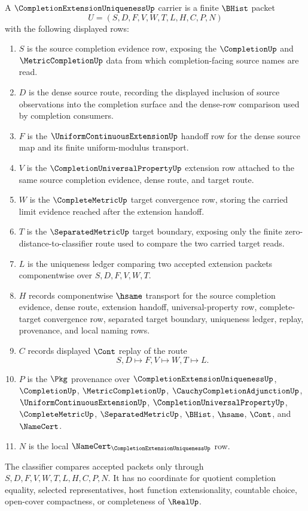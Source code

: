 \begin{definition}
\label{def:completion-extension-uniqueness-carrier}
A $\CompletionExtensionUniquenessUp$ carrier is a finite $\BHist$ packet
$$
U=(S,D,F,V,W,T,L,H,C,P,N)
$$
with the following displayed rows:
\begin{enumerate}
\item $S$ is the source completion evidence row, exposing the $\CompletionUp$ and $\MetricCompletionUp$ data from which completion-facing source names are read.
\item $D$ is the dense source route, recording the displayed inclusion of source observations into the completion surface and the dense-row comparison used by completion consumers.
\item $F$ is the $\UniformContinuousExtensionUp$ handoff row for the dense source map and its finite uniform-modulus transport.
\item $V$ is the $\CompletionUniversalPropertyUp$ extension row attached to the same source completion evidence, dense route, and target route.
\item $W$ is the $\CompleteMetricUp$ target convergence row, storing the carried limit evidence reached after the extension handoff.
\item $T$ is the $\SeparatedMetricUp$ target boundary, exposing only the finite zero-distance-to-classifier route used to compare the two carried target reads.
\item $L$ is the uniqueness ledger comparing two accepted extension packets componentwise over $S,D,F,V,W,T$.
\item $H$ records componentwise $\hsame$ transport for the source completion evidence, dense route, extension handoff, universal-property row, complete-target convergence row, separated target boundary, uniqueness ledger, replay, provenance, and local naming rows.
\item $C$ records displayed $\Cont$ replay of the route
$$
S,D\longmapsto F,V\longmapsto W,T\longmapsto L .
$$
\item $P$ is the $\Pkg$ provenance over $\CompletionExtensionUniquenessUp$, $\CompletionUp$, $\MetricCompletionUp$, $\CauchyCompletionAdjunctionUp$, $\UniformContinuousExtensionUp$, $\CompletionUniversalPropertyUp$, $\CompleteMetricUp$, $\SeparatedMetricUp$, $\BHist$, $\hsame$, $\Cont$, and $\NameCert$.
\item $N$ is the local $\NameCert_{\CompletionExtensionUniquenessUp}$ row.
\end{enumerate}
The classifier compares accepted packets only through $S,D,F,V,W,T,L,H,C,P,N$. It has no coordinate for quotient completion equality, selected representatives, host function extensionality, countable choice, open-cover compactness, or completeness of $\RealUp$.
\end{definition}

